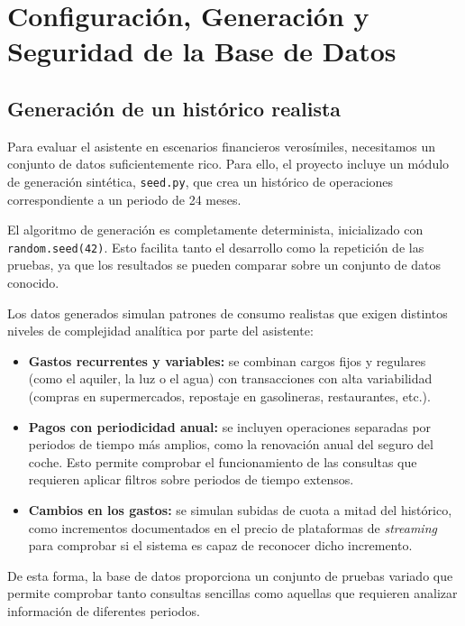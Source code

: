 \section{Configuración, Generación y Seguridad de la Base de Datos}

\subsection{Generación de un histórico realista}

Para evaluar el asistente en escenarios financieros verosímiles, necesitamos un 
conjunto de datos suficientemente rico. Para ello, el proyecto incluye un módulo 
de generación sintética, \texttt{seed.py}, que crea
un histórico de operaciones correspondiente a un periodo de 24 meses.

El algoritmo de generación es completamente determinista, inicializado con
\texttt{random.seed(42)}. Esto facilita tanto el desarrollo como la
repetición de las pruebas, ya que los resultados se pueden comparar sobre un
conjunto de datos conocido.

Los datos generados simulan patrones de consumo realistas que exigen distintos 
niveles de complejidad analítica por parte del asistente:

\begin{itemize}
    \item \textbf{Gastos recurrentes y variables:} se combinan cargos fijos y regulares (como el aquiler, la luz o el agua) con transacciones con alta variabilidad 
    (compras en supermercados, repostaje en gasolineras, restaurantes, etc.).

    \item \textbf{Pagos con periodicidad anual:} se incluyen operaciones
    separadas por periodos de tiempo más amplios, como la renovación anual del
    seguro del coche. Esto permite comprobar el funcionamiento de las consultas
    que requieren aplicar filtros sobre periodos de tiempo extensos.

    \item \textbf{Cambios en los gastos:} se simulan subidas de cuota a mitad del histórico, 
    como incrementos documentados en el precio de plataformas de 
    \textit{streaming} para comprobar si el sistema es capaz de reconocer dicho incremento.
\end{itemize}

De esta forma, la base de datos proporciona un conjunto de pruebas variado
que permite comprobar tanto consultas sencillas como aquellas que requieren
analizar información de diferentes periodos.

